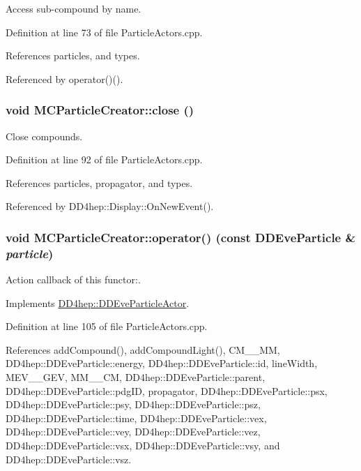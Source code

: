 Access sub-\/compound by name. 

Definition at line 73 of file ParticleActors.cpp.

References particles, and types.

Referenced by operator()().\hypertarget{struct_d_d4hep_1_1_m_c_particle_creator_aa238c6f5a187841abb59e61db1c3ddf9}{
\subsubsection[{close}]{\setlength{\rightskip}{0pt plus 5cm}void MCParticleCreator::close ()}}
\label{struct_d_d4hep_1_1_m_c_particle_creator_aa238c6f5a187841abb59e61db1c3ddf9}


Close compounds. 

Definition at line 92 of file ParticleActors.cpp.

References particles, propagator, and types.

Referenced by DD4hep::Display::OnNewEvent().\hypertarget{struct_d_d4hep_1_1_m_c_particle_creator_a42ebf0f3d55a5f02d9617ccf7aaf550a}{
\subsubsection[{operator()}]{\setlength{\rightskip}{0pt plus 5cm}void MCParticleCreator::operator() (const {\bf DDEveParticle} \& {\em particle})}}
\label{struct_d_d4hep_1_1_m_c_particle_creator_a42ebf0f3d55a5f02d9617ccf7aaf550a}


Action callback of this functor:. 

Implements \hyperlink{struct_d_d4hep_1_1_d_d_eve_particle_actor_a27707fecbdb50e7566ec01c784fcc669}{DD4hep::DDEveParticleActor}.

Definition at line 105 of file ParticleActors.cpp.

References addCompound(), addCompoundLight(), CM\_\_\-MM, DD4hep::DDEveParticle::energy, DD4hep::DDEveParticle::id, lineWidth, MEV\_\_\-GEV, MM\_\_\-CM, DD4hep::DDEveParticle::parent, DD4hep::DDEveParticle::pdgID, propagator, DD4hep::DDEveParticle::psx, DD4hep::DDEveParticle::psy, DD4hep::DDEveParticle::psz, DD4hep::DDEveParticle::time, DD4hep::DDEveParticle::vex, DD4hep::DDEveParticle::vey, DD4hep::DDEveParticle::vez, DD4hep::DDEveParticle::vsx, DD4hep::DDEveParticle::vsy, and DD4hep::DDEveParticle::vsz.

